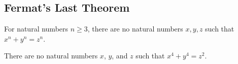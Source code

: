 \documentclass{article}
\theoremstyle{definition}
\newenvironment{manualtheorem}[1]{%
  \renewcommand{\thetheorem}{#1}%
  \theorem%
}{%
  \endtheorem%
}
\begin{document}
\subsection{Fermat's Last Theorem}

\begin{manualtheorem}{Fermat's Last Theorem}
	For natural numbers $n \ge 3$, there are no natural numbers $x, y, z$ such that $x^n + y^n = z^n$.
\end{manualtheorem}

\begin{manualtheorem}{8.24}
	There are no natural numbers $x$, $y$, and $z$ such that $x^4 + y^4 = z^2$.
\end{manualtheorem}
\end{document}
